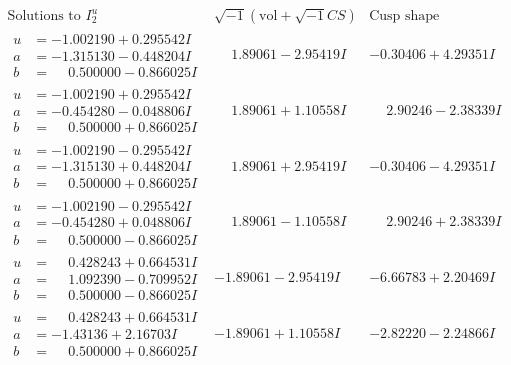 \documentclass[1p]{elsarticle_modified}
\theoremstyle{definition}
\newcommand{\I}{\sqrt{-1}}
\begin{document}
$$\begin{array}{c|c|c}  
\text{Solutions to }I^u_{2}& \I (\text{vol} + \sqrt{-1}CS) & \text{Cusp shape}\\
 \hline 
\begin{aligned}
u &= -1.002190 + 0.295542 I \\
a &= -1.315130 - 0.448204 I \\
b &= \phantom{-}0.500000 - 0.866025 I\end{aligned}
 & \phantom{-}1.89061 - 2.95419 I & -0.30406 + 4.29351 I \\ \hline\begin{aligned}
u &= -1.002190 + 0.295542 I \\
a &= -0.454280 - 0.048806 I \\
b &= \phantom{-}0.500000 + 0.866025 I\end{aligned}
 & \phantom{-}1.89061 + 1.10558 I & \phantom{-}2.90246 - 2.38339 I \\ \hline\begin{aligned}
u &= -1.002190 - 0.295542 I \\
a &= -1.315130 + 0.448204 I \\
b &= \phantom{-}0.500000 + 0.866025 I\end{aligned}
 & \phantom{-}1.89061 + 2.95419 I & -0.30406 - 4.29351 I \\ \hline\begin{aligned}
u &= -1.002190 - 0.295542 I \\
a &= -0.454280 + 0.048806 I \\
b &= \phantom{-}0.500000 - 0.866025 I\end{aligned}
 & \phantom{-}1.89061 - 1.10558 I & \phantom{-}2.90246 + 2.38339 I \\ \hline\begin{aligned}
u &= \phantom{-}0.428243 + 0.664531 I \\
a &= \phantom{-}1.092390 - 0.709952 I \\
b &= \phantom{-}0.500000 - 0.866025 I\end{aligned}
 & -1.89061 - 2.95419 I & -6.66783 + 2.20469 I \\ \hline\begin{aligned}
u &= \phantom{-}0.428243 + 0.664531 I \\
a &= -1.43136 + 2.16703 I \\
b &= \phantom{-}0.500000 + 0.866025 I\end{aligned}
 & -1.89061 + 1.10558 I & -2.82220 - 2.24866 I \\ \hline\begin{aligned}

\end{aligned}
\end{array}$$
\end{document}
